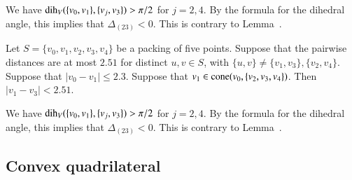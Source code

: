\begin{tarskidata}
\begin{tarski}
\begin{proved}
We have $\operatorname{dih}_V(\{v_0,v_1\},\{v_j,v_3\})>\pi/2$ for $j=2,4$.
  By the formula for the dihedral angle, this
implies that $\Delta_{(23)}<0$.  This is contrary to Lemma~.
\swallowed\end{proved}
\end{tarski}







\begin{tarski}

\begin{lemma}
Let $S=\{v_0,v_1,v_2,v_3,v_4\}$ be a packing of
five points.  Suppose that the pairwise
distances are at most $2.51$ for distinct $u,v\in S$, with
$\{u,v\}\ne \{v_1,v_3\}, \{v_2,v_4\}$.  Suppose that $|v_0-v_1|\le 2.3$.
Suppose that $v_1\in{\operatorname{cone}}(v_0,\{v_2,v_3,v_4\})$.
Then $|v_1-v_3|< 2.51$.  
\end{lemma}

\begin{proved}
We have $\operatorname{dih}_V(\{v_0,v_1\},\{v_j,v_3\})>\pi/2$ for $j=2,4$.
  By the formula for the dihedral angle, this
implies that $\Delta_{(23)}<0$.  This is contrary to Lemma~.
\swallowed\end{proved}
\end{tarski}









\begin{tarski}
\section{Convex quadrilateral}


\end{tarski}
\end{tarskidata}
